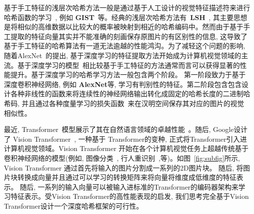 基于手工特征的浅层次哈希方法一般是通过基于人工设计的视觉特征描述符来进行哈希函数的学习~\cite{charikar2002similarity, indyk1997locality, weiss2008spectral}, 例如 \textbf{GIST}~\cite{oliva2001modeling}等。经典的浅层次哈希方法有~\textbf{LSH}~\cite{indyk1997locality}, 其主要思想是将相似的高维数据以比较大的概率被映射到相近的哈希编码中。然而由于基于手工提取的特征向量其实并不能准确的刻画保存原图片的有区别性的信息, 这导致了基于手工特征的哈希算法有一道无法逾越的性能鸿沟。为了减轻这个问题的影响, 随着AlexNet~\cite{}的提出, 基于深度学习的特征提取方法开始成为计算机视觉领域的主流。基于深度学习的模型~\cite{dosovitskiy2020image, russakovsky2015imagenet}相比较基于手工特征的方法通常而言可以获得显著的性能提升。基于深度学习的哈希学习方法一般包含两个阶段。 第一阶段致力于基于深度卷积神经网络, 例如 \textbf{AlexNet}等, 学习有判别性的特征。第二阶段包含包含设计各种非线性的函数来将连续性的神经网络输出转化成固定的哈希长度的二进制哈希码, 并且通过各种度量学习的损失函数~\cite{cakir2019hashing,cao2018deep,erin2015deep,gong2012iterative, li2015feature}来在汉明空间保存其对应的图片的视觉相似性。 \par
最近, Transformer~\cite{vaswani2017attention}模型展示了其在自然语言领域的卓越性能~\cite{brown2020language, devlin2018bert}。随后, Google设计了 Vision Transformer~\cite{dosovitskiy2020image}, 一种基于 Transformer的变种, 正式将Transformer引入进计算机视觉领域。Vision Transformer 开始在各个计算机视觉任务上超越传统基于卷积神经网络的模型(例如, 图像分类~\cite{dosovitskiy2020image}, 行人重识别~\cite{he2021transreid},等)。如图~\ref{fig:subfig}所示, Vision Transformer 通过首先将输入的图片分割成一系列的2D图片块。 随后, 将图片块转换成向量并且通过可以学习的转换矩阵来将向量将维度成低维度的特征表示。 随后, 一系列的输入向量可以被输入进标准的Transformer的编码器架构来学习特征表示。受Vision Transformer的高性能表现的启发, 我们思考完全基于Vision Transformer设计一个深度哈希框架的可行性。\par
